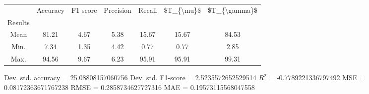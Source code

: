 \begin{tabular}{|c|c|c|c|c|c|c|}
\toprule
{} &  Accuracy &  F1 score &  Precision &  Recall &  \$T\_\{\textbackslash mu\}\$ &  \$T\_\{\textbackslash gamma\}\$ \\
Results &           &           &            &         &            &               \\
\hline
Mean    &     81.21 &      4.67 &       5.38 &   15.67 &      15.67 &         84.53 \\
Min.    &      7.34 &      1.35 &       4.42 &    0.77 &       0.77 &          2.85 \\
Max.    &     94.56 &      9.67 &       6.23 &   95.91 &      95.91 &         99.31 \\
\bottomrule
\end{tabular}

 Dev. std. accuracy = 25.08808157060756
 Dev. std. F1-score = 2.5235572652529514
 $R^2$ = -0.7789221336797492
 MSE = 0.08172363671767238
 RMSE = 0.2858734627727316
 MAE = 0.19573115568047558